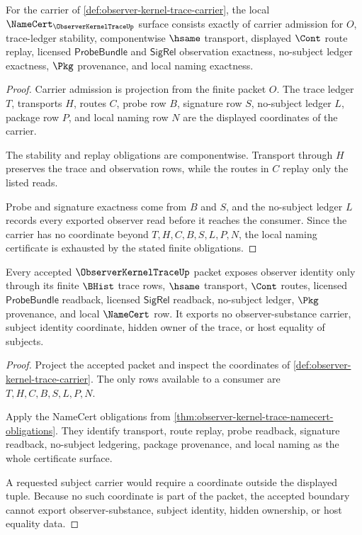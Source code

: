 \begin{theorem}
\label{thm:observer-kernel-trace-namecert-obligations}
For the carrier of \autoref{def:observer-kernel-trace-carrier}, the local $\NameCert_{\ObserverKernelTraceUp}$ surface consists exactly of carrier admission for $O$, trace-ledger stability, componentwise $\hsame$ transport, displayed $\Cont$ route replay, licensed $\mathsf{ProbeBundle}$ and $\mathsf{SigRel}$ observation exactness, no-subject ledger exactness, $\Pkg$ provenance, and local naming exactness.
\end{theorem}
\begin{proof}
Carrier admission is projection from the finite packet $O$. The trace ledger $T$, transports $H$, routes $C$, probe row $B$, signature row $S$, no-subject ledger $L$, package row $P$, and local naming row $N$ are the displayed coordinates of the carrier.

The stability and replay obligations are componentwise. Transport through $H$ preserves the trace and observation rows, while the routes in $C$ replay only the listed reads.

Probe and signature exactness come from $B$ and $S$, and the no-subject ledger $L$ records every exported observer read before it reaches the consumer. Since the carrier has no coordinate beyond $T,H,C,B,S,L,P,N$, the local naming certificate is exhausted by the stated finite obligations.
\end{proof}

\begin{theorem}
\label{thm:observer-kernel-trace-non-escape}
Every accepted $\ObserverKernelTraceUp$ packet exposes observer identity only through its finite $\BHist$ trace rows, $\hsame$ transport, $\Cont$ routes, licensed $\mathsf{ProbeBundle}$ readback, licensed $\mathsf{SigRel}$ readback, no-subject ledger, $\Pkg$ provenance, and local $\NameCert$ row. It exports no observer-substance carrier, subject identity coordinate, hidden owner of the trace, or host equality of subjects.
\end{theorem}
\begin{proof}
Project the accepted packet and inspect the coordinates of \autoref{def:observer-kernel-trace-carrier}. The only rows available to a consumer are $T,H,C,B,S,L,P,N$.

Apply the NameCert obligations from \autoref{thm:observer-kernel-trace-namecert-obligations}. They identify transport, route replay, probe readback, signature readback, no-subject ledgering, package provenance, and local naming as the whole certificate surface.

A requested subject carrier would require a coordinate outside the displayed tuple. Because no such coordinate is part of the packet, the accepted boundary cannot export observer-substance, subject identity, hidden ownership, or host equality data.
\end{proof}

